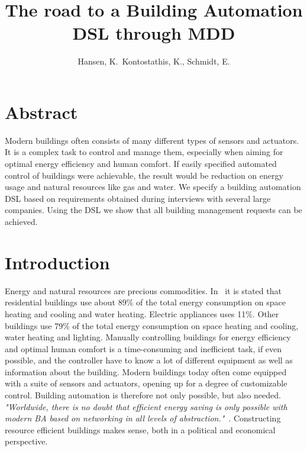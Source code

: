 \documentclass{llncs}
\begin{document}
\frontmatter
\pagestyle{headings}
\title{The road to a Building Automation DSL through MDD}
\author{Hansen, K.\, Kontostathis, K., Schmidt, E.}
\maketitle

\section{Abstract}
Modern buildings often consists of many different types of sensors and actuators. It is a complex task to control and manage them, especially when aiming for optimal energy efficiency and human comfort. If easily specified automated control of buildings were achievable, the result would be reduction on energy usage and natural resources like gas and water. We specify a building automation DSL based on requirements obtained during interviews with several large companies. Using the DSL we show that all building management requests can be achieved.

\section{Introduction}
Energy and natural resources are precious commodities. In~\cite{janssen2004towards} it is stated that residential buildings use about 89\% of the total energy consumption on space heating and cooling and water heating. Electric appliances uses 11\%. Other buildings use 79\% of the total energy consumption on space heating and cooling, water heating and lighting. Manually controlling buildings for energy efficiency and optimal human comfort is a time-consuming and inefficient task, if even possible, and the controller have to know a lot of different equipment as well as information about the building. Modern buildings today often come equipped with a suite of sensors and actuators, opening up for a degree of customizable control. Building automation is therefore not only possible, but also needed. \textit{"Worldwide, there is no doubt that efficient energy saving is only possible with modern BA based on networking in all levels of abstraction."}~\cite{dietrich2010communication}. Constructing resource efficient buildings makes sense, both in a political and economical perspective. 
\end{document}
